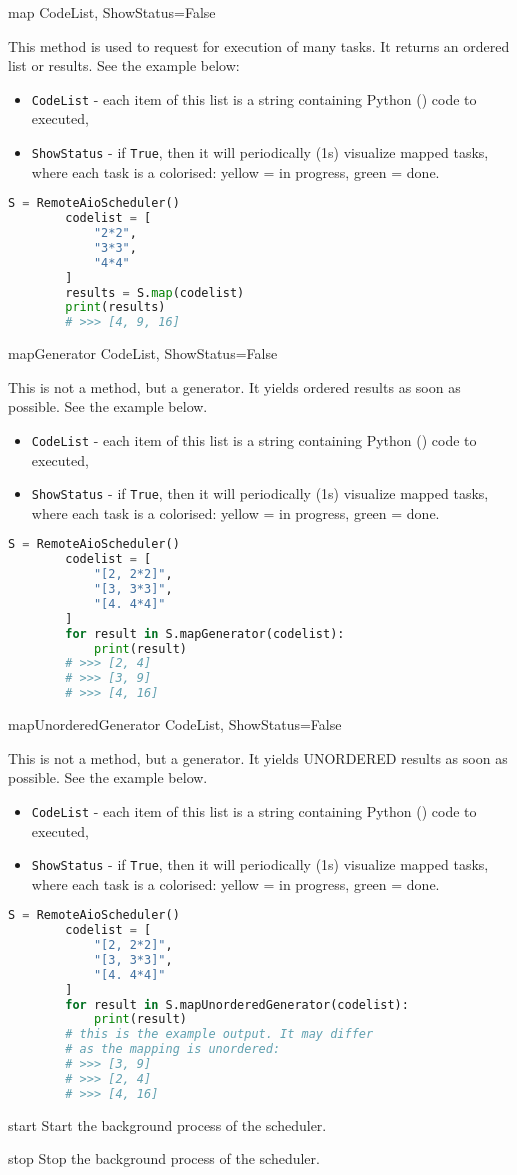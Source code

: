  {map} {CodeList, ShowStatus=False} {
	This method is used to request for execution of many tasks. It returns an ordered list or results. See the example below:
	\begin{itemize}
		\item \texttt{CodeList} - each item of this list is a string containing Python (\ShellName) code to executed,
		\item \texttt{ShowStatus} - if \texttt{True}, then it will periodically (1s) visualize mapped tasks, where each task is a colorised: yellow = in progress, green = done.
	\end{itemize}
}
\begin{lstlisting}[language=Python]
		S = RemoteAioScheduler()
		codelist = [
			"2*2",
			"3*3",
			"4*4"
		]
		results = S.map(codelist)
		print(results)
		# >>> [4, 9, 16]
\end{lstlisting}

 {mapGenerator} {CodeList, ShowStatus=False} {
	This is not a method, but a generator. It yields ordered results as soon as possible. See the example below.
	\begin{itemize}
		\item \texttt{CodeList} - each item of this list is a string containing Python (\ShellName) code to executed,
		\item \texttt{ShowStatus} - if \texttt{True}, then it will periodically (1s) visualize mapped tasks, where each task is a colorised: yellow = in progress, green = done.
	\end{itemize}
}
\begin{lstlisting}[language=Python]
		S = RemoteAioScheduler()
		codelist = [
			"[2, 2*2]",
			"[3, 3*3]",
			"[4. 4*4]"
		]
		for result in S.mapGenerator(codelist):
			print(result)
		# >>> [2, 4]
		# >>> [3, 9]
		# >>> [4, 16]
\end{lstlisting}

 {mapUnorderedGenerator} {CodeList, ShowStatus=False} {
	This is not a method, but a generator. It yields UNORDERED results as soon as possible. See the example below.
	\begin{itemize}
		\item \texttt{CodeList} - each item of this list is a string containing Python (\ShellName) code to executed,
		\item \texttt{ShowStatus} - if \texttt{True}, then it will periodically (1s) visualize mapped tasks, where each task is a colorised: yellow = in progress, green = done.
	\end{itemize}
}
\begin{lstlisting}[language=Python]
		S = RemoteAioScheduler()
		codelist = [
			"[2, 2*2]",
			"[3, 3*3]",
			"[4. 4*4]"
		]
		for result in S.mapUnorderedGenerator(codelist):
			print(result)
		# this is the example output. It may differ
		# as the mapping is unordered:
		# >>> [3, 9]
		# >>> [2, 4]
		# >>> [4, 16]
\end{lstlisting}

 {start} {} {
	Start the background process of the scheduler.
}

 {stop} {} {
	Stop the background process of the scheduler.
}



